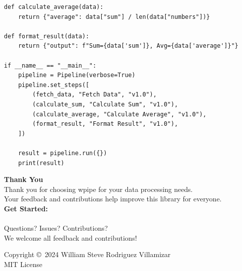 \documentclass[12pt,a4paper]{report}
\begin{document}
\begin{appendices}
\begin{lstlisting}[caption={Complete Example}, label={lst:complete}]
def calculate_average(data):
    return {"average": data["sum"] / len(data["numbers"])}

def format_result(data):
    return {"output": f"Sum={data['sum']}, Avg={data['average']}"}

if __name__ == "__main__":
    pipeline = Pipeline(verbose=True)
    pipeline.set_steps([
        (fetch_data, "Fetch Data", "v1.0"),
        (calculate_sum, "Calculate Sum", "v1.0"),
        (calculate_average, "Calculate Average", "v1.0"),
        (format_result, "Format Result", "v1.0"),
    ])

    result = pipeline.run({})
    print(result)
\end{lstlisting}

\end{appendices}

\cleardoublepage
\thispagestyle{empty}
\vspace*{3cm}

\begin{center}
{\color{blue!70!black}\Huge\textbf{\sffamily Thank You}}\\[2cm]

{\large\sffamily
Thank you for choosing wpipe for your data processing needs.}\\[0.5cm]

{\large\sffamily
Your feedback and contributions help improve this library for everyone.}\\[1.5cm]

{\Large\sffamily\textbf{Get Started:}}\\[0.5cm]

\\[2cm]

{\large\sffamily
Questions? Issues? Contributions?}\\[0.5cm]

{\large\sffamily
We welcome all feedback and contributions!}
\end{center}

\vfill

\begin{center}
{\small\sffamily
Copyright \copyright\ 2024 William Steve Rodriguez Villamizar}\\
{\small\sffamily
MIT License}
\end{center}
\end{document}
